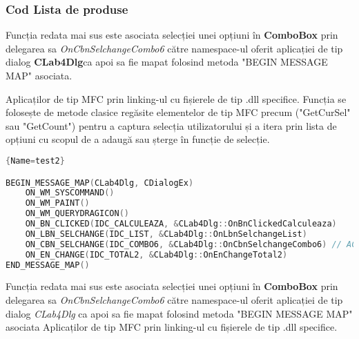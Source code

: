 \documentclass{amsart}
\begin{document}
\subsubsection{\textbf{Cod Lista de produse}}\hfill

\hfill \newline
\hfill \newline

 


 
\hfill \newline
Funcția redata mai sus este asociata selecției unei opțiuni în \textbf{ComboBox} prin delegarea sa \textit{OnCbnSelchangeCombo6} către namespace-ul oferit aplicației de tip dialog \textbf{CLab4Dlg}ca apoi sa fie mapat folosind metoda "BEGIN MESSAGE MAP" asociata.

 Aplicaților de tip MFC prin linking-ul cu fișierele  de tip .dll specifice.
\hfill \newline
	Funcția se folosește de metode clasice regăsite elementelor de tip MFC precum ("GetCurSel" sau "GetCount") pentru a captura selecția utilizatorului și a itera prin lista de opțiuni cu scopul de a adaugă sau șterge în funcție de selecție. 
 \hfill \newline
 




 

 \begin{lstlisting}[language=C++]{Name=test2}

BEGIN_MESSAGE_MAP(CLab4Dlg, CDialogEx)
	ON_WM_SYSCOMMAND()
	ON_WM_PAINT()
	ON_WM_QUERYDRAGICON()
	ON_BN_CLICKED(IDC_CALCULEAZA, &CLab4Dlg::OnBnClickedCalculeaza)
	ON_LBN_SELCHANGE(IDC_LIST, &CLab4Dlg::OnLbnSelchangeList)
	ON_CBN_SELCHANGE(IDC_COMBO6, &CLab4Dlg::OnCbnSelchangeCombo6) // ACESTA
	ON_EN_CHANGE(IDC_TOTAL2, &CLab4Dlg::OnEnChangeTotal2)
END_MESSAGE_MAP()

\end{lstlisting}

\hfill \newline
    Funcția redata mai sus este asociata selecției unei opțiuni în \textbf{ComboBox} prin delegarea sa \textit{OnCbnSelchangeCombo6} către namespace-ul oferit aplicației de tip dialog \textit{CLab4Dlg}
	ca apoi sa fie mapat folosind metoda "BEGIN MESSAGE MAP" asociata Aplicaților de tip MFC prin linking-ul cu fișierele  de tip .dll specifice.
\end{document}
